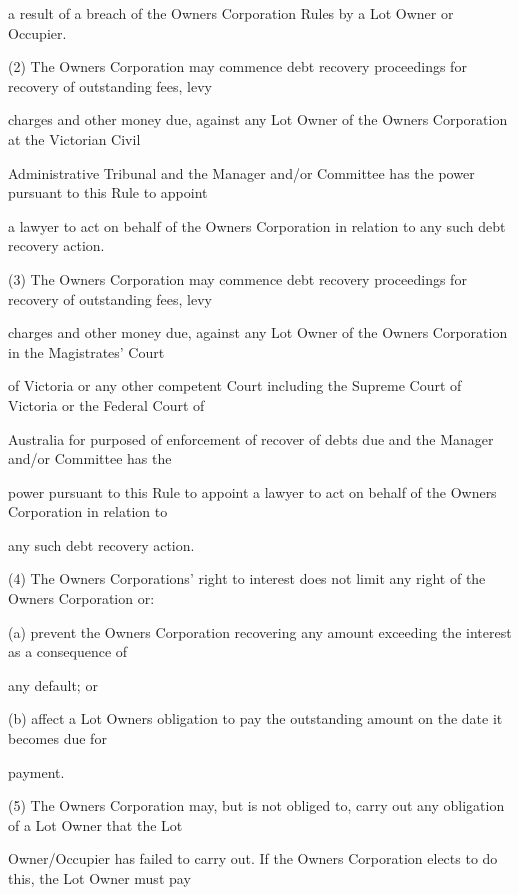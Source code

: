 \documentclass{article}
\begin{document}
{\fontsize{10.02}{1}a result of a breach of the Owners Corporation Rules by a Lot Owner or Occupier. }

{\fontsize{9.962}{1}(2) The Owners Corporation may commence debt recovery proceedings for recovery of outstanding fees, levy }

{\fontsize{10.02}{1}charges and other money due, against any Lot Owner of the Owners Corporation at the Victorian Civil }

{\fontsize{10.02}{1}Administrative Tribunal and the Manager and/or Committee has the power pursuant to this Rule to appoint }

{\fontsize{10.02}{1}a lawyer to act on behalf of the Owners Corporation in relation to any such debt recovery action. }

{\fontsize{9.962}{1}(3) The Owners Corporation may commence debt recovery proceedings for recovery of outstanding fees, levy }

{\fontsize{10.02}{1}charges and other money due, against any Lot Owner of the Owners Corporation in the Magistrates’ Court }

{\fontsize{10.02}{1}of Victoria or any other competent Court including the Supreme Court of Victoria or the Federal Court of }

{\fontsize{10.02}{1}Australia for purposed of enforcement of recover of debts due and the Manager and/or Committee has the }

{\fontsize{10.02}{1}power pursuant to this Rule to appoint a lawyer to act on behalf of the Owners Corporation in relation to }

{\fontsize{10.02}{1}any such debt recovery action. }

{\fontsize{9.962}{1}(4) The Owners Corporations’ right to interest does not limit any right of the Owners Corporation or: }

{\fontsize{9.962}{1}(a) prevent the Owners Corporation recovering any amount exceeding the interest as a consequence of }

{\fontsize{10.02}{1}any default; or }

{\fontsize{9.962}{1}(b) affect a Lot Owners obligation to pay the outstanding amount on the date it becomes due for }

{\fontsize{10.02}{1}payment. }

{\fontsize{9.962}{1}(5) The Owners Corporation may, but is not obliged to, carry out any obligation of a Lot Owner that the Lot }

{\fontsize{10.02}{1}Owner/Occupier has failed to carry out. If the Owners Corporation elects to do this, the Lot Owner must pay }
\end{document}
